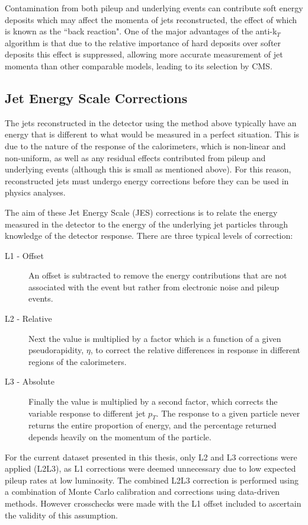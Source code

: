 Contamination from both pileup and underlying events can contribute soft energy deposits which may affect the momenta of jets reconstructed, the effect of which is known as the ``back reaction". One of the major advantages of the anti-k$_{T}$ algorithm is that due to the relative importance of hard deposits over softer deposits this effect is suppressed, allowing more accurate measurement of jet momenta than other comparable models, leading to its selection by CMS.
\subsection{Jet Energy Scale Corrections}
\label{sec:JES}
The jets reconstructed in the detector using the method above typically have an energy that is different to what would be measured in a perfect situation. This is due to the nature of the response of the calorimeters, which is non-linear and non-uniform, as well as any residual effects contributed from pileup and underlying events (although this is small as mentioned above). For this reason, reconstructed jets must undergo energy corrections before they can be used in physics analyses. 

The aim of these Jet Energy Scale (JES) corrections is to relate the energy measured in the detector to the energy of the underlying jet particles through knowledge of the detector response. There are three typical levels of correction:

\begin{description}
\item[L1 - Offset]{An offset is subtracted to remove the energy contributions that are not associated with the event but rather from electronic noise and pileup events.  }
\item[L2 - Relative]{Next the value is multiplied by a factor which is a function of a given pseudorapidity, $\eta$, to correct the relative differences in response in different regions of the calorimeters.}
\item [L3 - Absolute]{Finally the value is multiplied by a second factor, which corrects the variable response to different jet $p_{T}$. The response to a given particle never returns the entire proportion of energy, and the percentage returned depends heavily on the momentum of the particle.}
\end{description}

For the current dataset presented in this thesis, only L2 and L3 corrections were applied (L2L3), as L1 corrections were deemed unnecessary due to low expected pileup rates at low luminosity. The combined L2L3 correction is performed using a combination of Monte Carlo calibration and corrections using data-driven methods. However crosschecks were made with the L1 offset included to ascertain the validity of this assumption.


